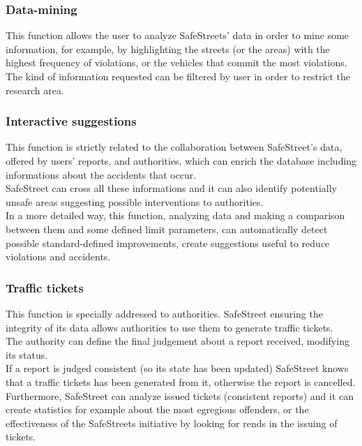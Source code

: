 \documentclass{article}
\begin{document}
        \subsubsection{Data-mining}
        This function allows the user to analyze SafeStreets' data in order to mine some information, for example, by highlighting the streets (or the areas) with the highest frequency of violations, or the vehicles that commit the most violations. The kind of information requested can be filtered by user in order to restrict the research area. \\
        
        \subsubsection{Interactive suggestions}
        This function is strictly related to the collaboration between SafeStreet's data, offered by users' reports, and authorities, which can enrich the database including informations about the accidents that occur. \\SafeStreet can cross all these informations and it can also identify potentially unsafe areas suggesting possible interventions to authorities. \\
        In a more detailed way, this function, analyzing data and making a comparison between them and some defined limit parameters, can automatically detect possible standard-defined improvements, create suggestions useful to reduce violations and accidents.
        
        \subsubsection{Traffic tickets}
        This function is specially addressed to authorities. SafeStreet ensuring the integrity of its data allows authorities to use them to generate traffic tickets. \\
        The authority can define the final judgement about a report received, modifying its status.\\
        If a report is judged consistent (so its state has been updated) SafeStreet knows that a traffic tickets has been generated from it, otherwise the report is cancelled.\\
        Furthermore, SafeStreet can analyze issued tickets (consistent reports) and it can create statistics for example about the most egregious offenders, or the effectiveness of the SafeStreets initiative by looking for rends in the issuing of tickets.
        
\end{document}
